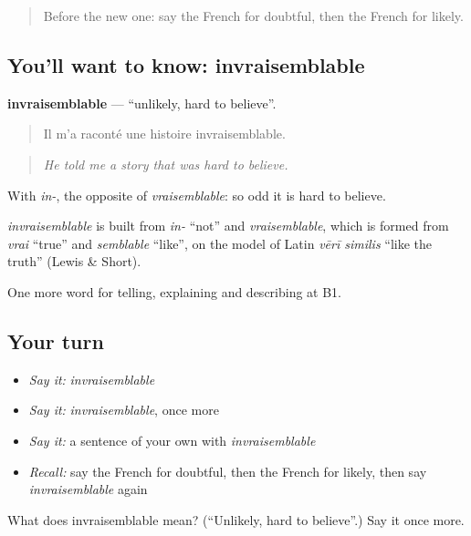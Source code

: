 \label{lesson:FR-C340-invraisemblable}



\begin{quote}
Before the new one: say the French for doubtful, then the French for likely.
\end{quote}

\subsection*{You'll want to know: invraisemblable}
\textbf{invraisemblable} — \textquotedblleft{}unlikely, hard to believe\textquotedblright{}.

\begin{quote}
Il m'a raconté une histoire invraisemblable.
\end{quote}

\begin{quote}
\emph{He told me a story that was hard to believe.}
\end{quote}

With \emph{in-}, the opposite of \emph{vraisemblable}: so odd it is hard to believe.

\begin{cousinweb}
\emph{invraisemblable} is built from \emph{in-} \textquotedblleft{}not\textquotedblright{} and \emph{vraisemblable}, which is formed from \emph{vrai} \textquotedblleft{}true\textquotedblright{} and \emph{semblable} \textquotedblleft{}like\textquotedblright{}, on the model of Latin \emph{vērī similis} \textquotedblleft{}like the truth\textquotedblright{} (Lewis \& Short).
\end{cousinweb}

\begin{grammarlens}[title={What you've built}]
One more word for telling, explaining and describing at B1.
\end{grammarlens}

\subsection*{Your turn}
\begin{itemize}
\raggedright
  \item \emph{Say it:} \emph{invraisemblable}
  \item \emph{Say it:} \emph{invraisemblable}, once more
  \item \emph{Say it:} a sentence of your own with \emph{invraisemblable}
  \item \emph{Recall:} say the French for doubtful, then the French for likely, then say \emph{invraisemblable} again
\end{itemize}

\begin{tcolorbox}[breakable,colback=teal!4,colframe=teal!35!black,title={Before you move on}]
What does invraisemblable mean? (\textquotedblleft{}Unlikely, hard to believe\textquotedblright{}.) Say it once more.
\end{tcolorbox}
